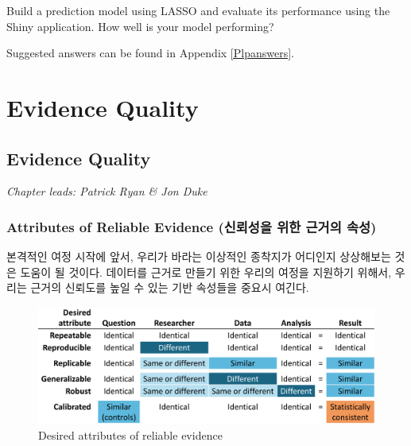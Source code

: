 \documentclass[11pt]{book}
\theoremstyle{definition}
\theoremstyle{definition}
\theoremstyle{definition}
\theoremstyle{remark}
\let\BeginKnitrBlock\begin \let\EndKnitrBlock\end
\begin{document}
\BeginKnitrBlock{exercise}
\protect\hypertarget{exr:exercisePlp3}{}{\label{exr:exercisePlp3} }Build a
prediction model using LASSO and evaluate its performance using the
Shiny application. How well is your model performing?
\EndKnitrBlock{exercise}

Suggested answers can be found in Appendix \ref{Plpanswers}.

\part{Evidence Quality}\label{part-evidence-quality}

\chapter{Evidence Quality}\label{EvidenceQuality}

\emph{Chapter leads: Patrick Ryan \& Jon Duke}


\section{Attributes of Reliable Evidence (신뢰성을 위한 근거의
속성)}\label{attributes-of-reliable-evidence----}

본격적인 여정 시작에 앞서, 우리가 바라는 이상적인 종착지가 어디인지
상상해보는 것은 도움이 될 것이다. 데이터를 근거로 만들기 위한 우리의
여정을 지원하기 위해서, 우리는 근거의 신뢰도를 높일 수 있는 기반
속성들을 중요시 여긴다.

\begin{figure}

{\centering \includegraphics[width=1\linewidth]{images/EvidenceQuality/reliableevidenceattributes} 

}

\caption{Desired attributes of reliable evidence}\label{fig:attributesOfEvidence}
\end{figure}
\end{document}
